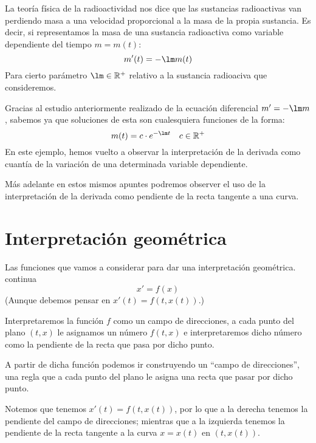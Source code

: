 \begin{ejemplo}
    La teoría física de la radioactividad nos dice que las sustancias radioactivas van perdiendo masa a una velocidad proporcional a la masa de la propia sustancia. Es decir, si representamos la masa de una sustancia radioactiva como variable dependiente del tiempo $m=m(t)$:
    \begin{equation*}
        m'(t) = -\lm m(t)
    \end{equation*}
    Para cierto parámetro $\lm \in \mathbb{R}^+$ relativo a la sustancia radioaciva que consideremos.

    Gracias al estudio anteriormente realizado de la ecuación diferencial $m' = -\lm m$, sabemos ya que soluciones de esta son cualesquiera funciones de la forma:
    \begin{equation*}
        m(t) = c\cdot e^{-\lm t}\quad c\in \mathbb{R}^+
    \end{equation*}
En este ejemplo, hemos vuelto a observar la interpretación de la derivada como cuantía de la variación de una determinada variable dependiente.
\end{ejemplo}

Más adelante en estos mismos apuntes podremos observer el uso de la interpretación de la derivada como pendiente de la recta tangente a una curva.

\section{Interpretación geométrica}
Las funciones que vamos a considerar para dar una interpretación geométrica.
continua
\begin{equation*}
    x' = f(x)
\end{equation*}
(Aunque debemos pensar en $x'(t) = f(t,x(t))$.)


Interpretaremos la función $f$ como un campo de direcciones, a cada punto del plano $(t,x)$ le asignamos un número $f(t,x)$ e interpretaremos dicho número como la pendiente de la recta que pasa por dicho punto.

A partir de dicha función podemos ir construyendo un ``campo de direcciones'', una regla que a cada punto del plano le asigna una recta que pasar por dicho punto.

Notemos que tenemos $x'(t) = f(t,x(t))$, por lo que a la derecha tenemos la pendiente del campo de direcciones; mientras que a la izquierda tenemos la pendiente de la recta tangente a la curva $x=x(t)$ en $(t,x(t))$.

